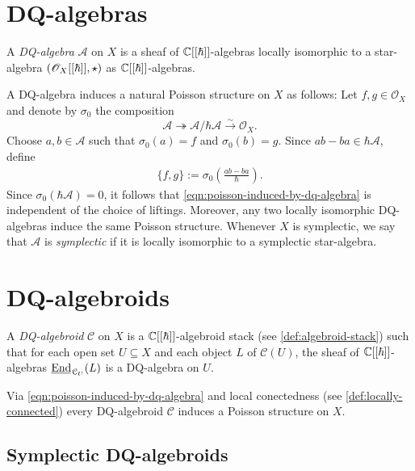 \section{DQ-algebras}
\begin{definition}\label{def:dq-algebra}
	A \textit{DQ-algebra} $\mathscr{A}$ on $X$ is a sheaf of ${\mathbb C}[[\hbar]]$-algebras locally isomorphic to a star-algebra $(\mathscr{O}_{X}[[\hbar]], \star)$ as ${\mathbb C}[[\hbar]]$-algebras. 
\end{definition}
A DQ-algebra induces a natural Poisson structure on $X$ as follows: Let $f,g \in \mathscr{O}_{X}$ and denote by $\sigma_{0}$ the composition
	\[
		\mathscr{A} \twoheadrightarrow \mathscr{A}/\hbar\mathscr{A} \xrightarrow{\sim} \mathscr{O}_{X}.
	\]
Choose $a, b \in \mathscr{A}$ such that $\sigma_{0}(a) = f$ and $\sigma_{0}(b) = g$. Since $ab - ba \in \hbar\mathscr{A}$, define	
\begin{align}\label{eqn:poisson-induced-by-dq-algebra}
		\{f,g\} := \sigma_{0}\left(\frac{ab - ba}{\hbar}\right).
\end{align}
Since $\sigma_{0}(\hbar\mathscr{A}) = 0$, it follows that \eqref{eqn:poisson-induced-by-dq-algebra} is independent of the choice of liftings. Moreover, any two locally isomorphic DQ-algebras induce the same Poisson structure. Whenever $X$ is symplectic, we say that $\mathscr{A}$ is \emph{symplectic} if it is locally isomorphic to a symplectic star-algebra.
\section{DQ-algebroids}
\begin{definition}\label{def:dq-algebroid}
	A \textit{DQ-algebroid} $\mathcal{C}$ on $X$ is a ${\mathbb C}[[\hbar]]$-algebroid stack (see \cref{def:algebroid-stack}) such that for each open set $U \subseteq X$ and each object $L$ of $\mathcal{C}(U)$, the sheaf of ${\mathbb C}[[\hbar]]$-algebras $\uEnd_{\mathcal{C}_{U}}(L)$ is a DQ-algebra on $U$.
\end{definition}
Via \eqref{eqn:poisson-induced-by-dq-algebra} and local conectedness (see \cref{def:locally-connected}) every DQ-algebroid $\mathcal{C}$ induces a Poisson structure on $X$.
\subsection{Symplectic DQ-algebroids}
\begin{definition}\label{def:symplectic-DQ-algebroid} 
	
\end{definition}

